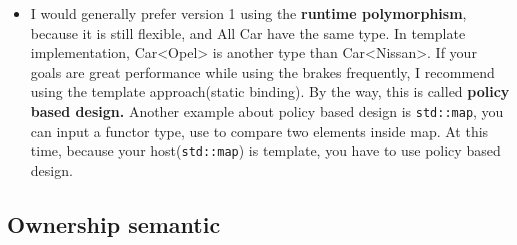 \documentclass[a4paper,11pt,twoside]{book}
\begin{document}
\begin{itemize}
	\item I would generally prefer version 1 using the \textbf{runtime polymorphism}, because it is still flexible, and All Car  have the same type. In template implementation,  Car<Opel> is another type than Car<Nissan>. If your goals are great performance while using the brakes frequently, I recommend using the template approach(static binding). By the way, this is called \textbf{policy based design.} Another example about policy based design is \texttt{std::map}, you can input a functor type, use to compare two elements inside map. At this time, because your host(\texttt{std::map}) is template, you have to use policy based design.
\end{itemize}


\subsection{Ownership semantic}
\end{document}
